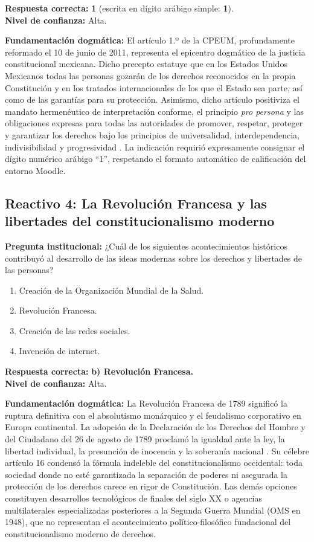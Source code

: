 \documentclass[12pt,spanish,letterpaper,oneside]{article}
\begin{document}
\textbf{Respuesta correcta:} \textbf{1} (escrita en d\'igito ar\'abigo simple: \textbf{1}). \\
\textbf{Nivel de confianza:} Alta.

\textbf{Fundamentaci\'on dogm\'atica:} El art\'iculo 1.º de la CPEUM, profundamente reformado el 10 de junio de 2011, representa el epicentro dogm\'atico de la justicia constitucional mexicana. Dicho precepto estatuye que en los Estados Unidos Mexicanos todas las personas gozar\'an de los derechos reconocidos en la propia Constituci\'on y en los tratados internacionales de los que el Estado sea parte, as\'i como de las garant\'ias para su protecci\'on. Asimismo, dicho art\'iculo positiviza el mandato hermen\'eutico de interpretaci\'on conforme, el principio \emph{pro persona} y las obligaciones expresas para todas las autoridades de promover, respetar, proteger y garantizar los derechos bajo los principios de universalidad, interdependencia, indivisibilidad y progresividad \citep{cpeumADH2026, scjnParametro2014ADH}. La indicaci\'on requiri\'o expresamente consignar el d\'igito num\'erico ar\'abigo ``1'', respetando el formato autom\'atico de calificaci\'on del entorno Moodle.

\subsection{Reactivo 4: La Revoluci\'on Francesa y las libertades del constitucionalismo moderno}
\textbf{Pregunta institucional:} ¿Cu\'al de los siguientes acontecimientos hist\'oricos contribuy\'o al desarrollo de las ideas modernas sobre los derechos y libertades de las personas?
\begin{enumerate}
\item[a)] Creaci\'on de la Organizaci\'on Mundial de la Salud.
\item[b)] Revoluci\'on Francesa.
\item[c)] Creaci\'on de las redes sociales.
\item[d)] Invenci\'on de internet.
\end{enumerate}

\textbf{Respuesta correcta:} \textbf{b) Revoluci\'on Francesa.} \\
\textbf{Nivel de confianza:} Alta.

\textbf{Fundamentaci\'on dogm\'atica:} La Revoluci\'on Francesa de 1789 signific\'o la ruptura definitiva con el absolutismo mon\'arquico y el feudalismo corporativo en Europa continental. La adopci\'on de la Declaraci\'on de los Derechos del Hombre y del Ciudadano del 26 de agosto de 1789 proclam\'o la igualdad ante la ley, la libertad individual, la presunci\'on de inocencia y la soberan\'ia nacional \citep{declaracionFrancia1789ADH}. Su c\'elebre art\'iculo 16 condens\'o la f\'ormula indeleble del constitucionalismo occidental: toda sociedad donde no est\'e garantizada la separaci\'on de poderes ni asegurada la protecci\'on de los derechos carece en rigor de Constituci\'on. Las dem\'as opciones constituyen desarrollos tecnol\'ogicos de finales del siglo XX o agencias multilaterales especializadas posteriores a la Segunda Guerra Mundial (OMS en 1948), que no representan el acontecimiento pol\'itico-filos\'ofico fundacional del constitucionalismo moderno de derechos.
\end{document}
